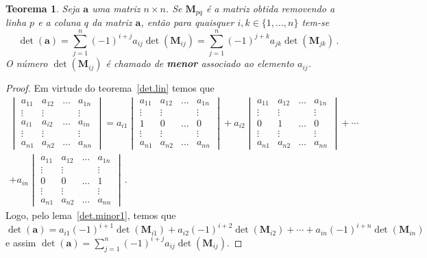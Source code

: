 \documentclass[12pt,a4paper]{report}
\newcommand{\tb}{\textbf}
\newcommand{\tbu}[1]{\tb{\textup{#1}}}
\newcommand{\mb}{\mathbf}
\newtheorem{thm}{Teorema}[chapter]
\begin{document}
\begin{thm}
  \label{det.minor}
  Seja $\mb a$ uma matriz $n\times n$. Se $\mb M_{pq}$ é a matriz obtida removendo a linha $p$ e a coluna $q$ da matriz $\mb a$, então para quaisquer $i,k\in\{1,\ldots,n\}$ tem-se
  $$\det(\mb a)=\sum_{j=1}^n(-1)^{i+j}a_{ij}\det(\mb M_{ij})=\sum_{j=1}^n(-1)^{j+k}a_{jk}\det(\mb M_{jk})\,.$$
  O número $\det(\mb M_{ij})$ é chamado de \tbu{menor} associado ao elemento $a_{ij}$.
\end{thm}
\begin{proof}
  Em virtude do teorema~\ref{det.lin} temos que
  \begin{multline*}
    \begin{vmatrix}
      a_{11}&a_{12}&\ldots&a_{1n}\\
      \vdots&\vdots&&\vdots\\
      a_{i1}&a_{i2}&\ldots&a_{in}\\
      \vdots&\vdots&&\vdots\\
      a_{n1}&a_{n2}&\ldots&a_{nn}
    \end{vmatrix}=a_{i1}\begin{vmatrix}
      a_{11}&a_{12}&\ldots&a_{1n}\\
      \vdots&\vdots&&\vdots\\
      1&0&\ldots&0\\
      \vdots&\vdots&&\vdots\\
      a_{n1}&a_{n2}&\ldots&a_{nn}
    \end{vmatrix}+a_{i2}\begin{vmatrix}
      a_{11}&a_{12}&\ldots&a_{1n}\\
      \vdots&\vdots&&\vdots\\
      0&1&\ldots&0\\
      \vdots&\vdots&&\vdots\\
      a_{n1}&a_{n2}&\ldots&a_{nn}
    \end{vmatrix}+\cdots\\
    +a_{in}\begin{vmatrix}
      a_{11}&a_{12}&\ldots&a_{1n}\\
      \vdots&\vdots&&\vdots\\
      0&0&\ldots&1\\
      \vdots&\vdots&&\vdots\\
      a_{n1}&a_{n2}&\ldots&a_{nn}
    \end{vmatrix}\,.
  \end{multline*}
  Logo, pelo lema~\ref{det.minor1}, temos que
  $$\det(\mb a)=a_{i1}(-1)^{i+1}\det(\mb M_{i1})+a_{i2}(-1)^{i+2}\det(\mb M_{i2})+\cdots+a_{in}(-1)^{i+n}\det(\mb M_{in})$$
  e assim $\det(\mb a)=\sum_{j=1}^n(-1)^{i+j}a_{ij}\det(\mb M_{ij})$.
\end{proof}
\end{document}
